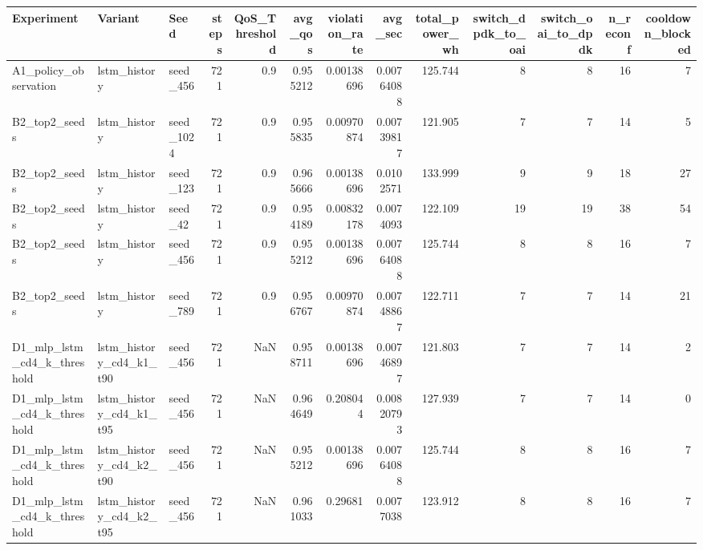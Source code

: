 \begin{tabular}{lllrrrrrrrrrr}
\toprule
Experiment & Variant & Seed & steps & QoS_Threshold & avg_qos & violation_rate & avg_sec & total_power_wh & switch_dpdk_to_oai & switch_oai_to_dpdk & n_reconf & cooldown_blocked \\
\midrule
A1_policy_observation & lstm_history & seed_456 & 721 & 0.9 & 0.955212 & 0.00138696 & 0.00764088 & 125.744 & 8 & 8 & 16 & 7 \\
B2_top2_seeds & lstm_history & seed_1024 & 721 & 0.9 & 0.955835 & 0.00970874 & 0.00739817 & 121.905 & 7 & 7 & 14 & 5 \\
B2_top2_seeds & lstm_history & seed_123 & 721 & 0.9 & 0.965666 & 0.00138696 & 0.0102571 & 133.999 & 9 & 9 & 18 & 27 \\
B2_top2_seeds & lstm_history & seed_42 & 721 & 0.9 & 0.954189 & 0.00832178 & 0.0074093 & 122.109 & 19 & 19 & 38 & 54 \\
B2_top2_seeds & lstm_history & seed_456 & 721 & 0.9 & 0.955212 & 0.00138696 & 0.00764088 & 125.744 & 8 & 8 & 16 & 7 \\
B2_top2_seeds & lstm_history & seed_789 & 721 & 0.9 & 0.956767 & 0.00970874 & 0.00748867 & 122.711 & 7 & 7 & 14 & 21 \\
D1_mlp_lstm_cd4_k_threshold & lstm_history_cd4_k1_t90 & seed_456 & 721 & NaN & 0.958711 & 0.00138696 & 0.00746897 & 121.803 & 7 & 7 & 14 & 2 \\
D1_mlp_lstm_cd4_k_threshold & lstm_history_cd4_k1_t95 & seed_456 & 721 & NaN & 0.964649 & 0.208044 & 0.00820793 & 127.939 & 7 & 7 & 14 & 0 \\
D1_mlp_lstm_cd4_k_threshold & lstm_history_cd4_k2_t90 & seed_456 & 721 & NaN & 0.955212 & 0.00138696 & 0.00764088 & 125.744 & 8 & 8 & 16 & 7 \\
D1_mlp_lstm_cd4_k_threshold & lstm_history_cd4_k2_t95 & seed_456 & 721 & NaN & 0.961033 & 0.29681 & 0.0077038 & 123.912 & 8 & 8 & 16 & 7 \\
\bottomrule
\end{tabular}

